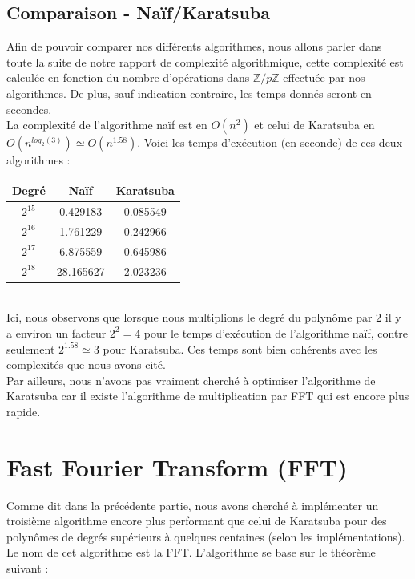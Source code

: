 \documentclass[12pt, a4paper]{article}
\begin{document}
\subsection{Comparaison - Naïf/Karatsuba}
Afin de pouvoir comparer nos différents algorithmes, nous allons parler dans toute la suite de notre rapport de complexité algorithmique, cette complexité est calculée en fonction du nombre d'opérations dans $\mathbb{Z}/p\mathbb{Z}$ effectuée par nos algorithmes. De plus, sauf indication contraire, les temps donnés seront en secondes.\\
\indent La complexité de l'algorithme naïf est en $O(n^2)$ et celui de Karatsuba en ${O(n^{log_2(3)}) \simeq O(n^{1.58})}$. Voici les temps d'exécution (en seconde) de ces deux algorithmes :
\begin{center}
\begin{tabular}{||c c c||}
\hline
Degré & Naïf & Karatsuba \\
\hline\hline
$2^{15}$ & 0.429183 & 0.085549 \\
\hline
$2^{16}$ & 1.761229 & 0.242966 \\
\hline
$2^{17}$ & 6.875559 & 0.645986 \\
\hline
$2^{18}$ & 28.165627 & 2.023236 \\
\hline
\end{tabular}
\end{center}
{}
\ \\
\indent Ici, nous observons que lorsque nous multiplions le degré du polynôme par $2$ il y a environ un facteur $2^2 = 4$ pour le temps d'exécution de l'algorithme naïf, contre seulement $2^{1.58} \simeq 3$ pour Karatsuba. Ces temps sont bien cohérents avec les complexités que nous avons cité. \\
\indent Par ailleurs, nous n'avons pas vraiment cherché à optimiser l'algorithme de Karatsuba car il existe l'algorithme de multiplication par FFT qui est encore plus rapide.

\newpage

\section{Fast Fourier Transform (FFT)}

Comme dit dans la précédente partie, nous avons cherché à implémenter un troisième algorithme encore plus performant que celui de Karatsuba pour des polynômes de degrés supérieurs à quelques centaines (selon les implémentations). Le nom de cet algorithme est la FFT. L'algorithme se base sur le théorème suivant :
\end{document}
